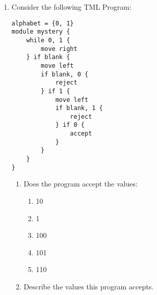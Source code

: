 \documentclass[answers]{exam}
\begin{document}
    \begin{enumerate}
        \item Consider the following TML Program:
\begin{lstlisting}[language=TML]
alphabet = {0, 1}
module mystery {
    while 0, 1 {
        move right
    } if blank {
        move left
        if blank, 0 {
            reject
        } if 1 {
            move left
            if blank, 1 {
                reject
            } if 0 {
                accept
            }
        }
    }
}
\end{lstlisting}
        \begin{enumerate}
            \item Does the program accept the values:
            \begin{enumerate}
                \item 10
                \begin{solution}
                    
                \end{solution}
                
                \item 1
                \begin{solution}
                    
                \end{solution}
                
                \item 100
                \begin{solution}
                    
                \end{solution}
                
                \item 101
                \begin{solution}
                    
                \end{solution}
                
                \item 110
                \begin{solution}
                    
                \end{solution}
            \end{enumerate}
            
            \item Describe the values this program accepts.
            \begin{solution}
                

\end{solution}
\end{enumerate}
\end{enumerate}
\end{document}
